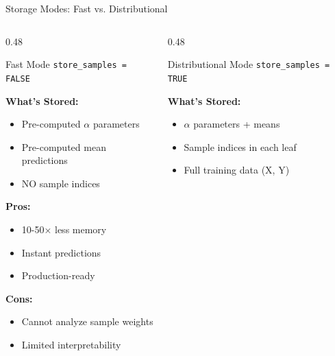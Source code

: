 \documentclass[aspectratio=169]{beamer}
\begin{document}
\begin{frame}{Storage Modes: Fast vs. Distributional}

\begin{columns}[T]

\begin{column}{0.48\textwidth}
\begin{block}{Fast Mode}
\texttt{store\_samples = FALSE}
\end{block}

\textbf{What's Stored:}
\begin{itemize}
\item Pre-computed $\alpha$ parameters
\item Pre-computed mean predictions
\item NO sample indices
\end{itemize}

\vspace{0.2cm}

\textbf{Pros:}
\begin{itemize}
\item 10-50× less memory
\item Instant predictions
\item Production-ready
\end{itemize}

\vspace{0.2cm}

\textbf{Cons:}
\begin{itemize}
\item Cannot analyze sample weights
\item Limited interpretability
\end{itemize}

\end{column}

\begin{column}{0.48\textwidth}
\begin{block}{Distributional Mode}
\texttt{store\_samples = TRUE}
\end{block}

\textbf{What's Stored:}
\begin{itemize}
\item $\alpha$ parameters + means
\item Sample indices in each leaf
\item Full training data (X, Y)
\end{itemize}


\end{column}
\end{columns}
\end{frame}
\end{document}
